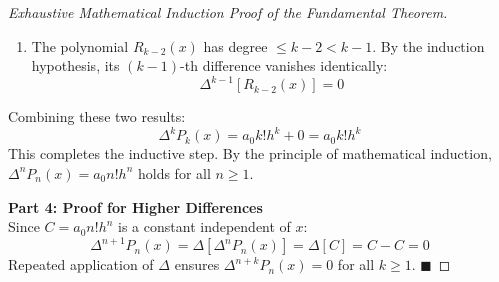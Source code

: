 \begin{proof}[Exhaustive Mathematical Induction Proof of the Fundamental Theorem]
\begin{enumerate}
    \begin{equation}
        \Delta^{k-1}[(a_0 k h) x^{k-1}] = (a_0 k h) \cdot (k - 1)! h^{k-1} = a_0 \cdot [k(k-1)!] \cdot [h \cdot h^{k-1}] = a_0 k! h^k
    \end{equation}
    \item The polynomial $R_{k-2}(x)$ has degree $\le k - 2 < k - 1$. By the induction hypothesis, its $(k-1)$-th difference vanishes identically:
    \begin{equation}
        \Delta^{k-1}[R_{k-2}(x)] = 0
    \end{equation}
\end{enumerate}
Combining these two results:
\begin{equation}
    \boxed{\Delta^k P_k(x) = a_0 k! h^k + 0 = a_0 k! h^k}
\end{equation}
This completes the inductive step. By the principle of mathematical induction, $\Delta^n P_n(x) = a_0 n! h^n$ holds for all $n \ge 1$.

\medskip
\noindent\textbf{Part 4: Proof for Higher Differences} \\
Since $C = a_0 n! h^n$ is a constant independent of $x$:
\begin{equation}
    \Delta^{n+1} P_n(x) = \Delta [\Delta^n P_n(x)] = \Delta [C] = C - C = 0
\end{equation}
Repeated application of $\Delta$ ensures $\Delta^{n+k} P_n(x) = 0$ for all $k \ge 1$. $\blacksquare$
\end{proof}


